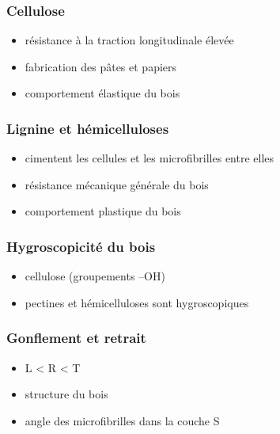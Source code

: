 \begin{multicols}{2}
\subsubsection{Cellulose}

\begin{itemize}
\item résistance à la traction longitudinale élevée
\item fabrication des pâtes et papiers
\item comportement élastique du bois
\end{itemize}			

\subsubsection{Lignine et hémicelluloses}
	
\begin{itemize}
\item cimentent les cellules et les microfibrilles entre elles
\item résistance mécanique générale du bois
\item comportement plastique du bois
\end{itemize}

\subsubsection{Hygroscopicité du bois}	

\begin{itemize}
\item cellulose (groupements --OH)
\item pectines et hémicelluloses sont hygroscopiques
\end{itemize}

\subsubsection{Gonflement et retrait}\label{gonflement}

\begin{itemize}
\item L < R < T
\item structure du bois
\item angle des microfibrilles dans la couche S
\end{itemize}



\end{multicols}
